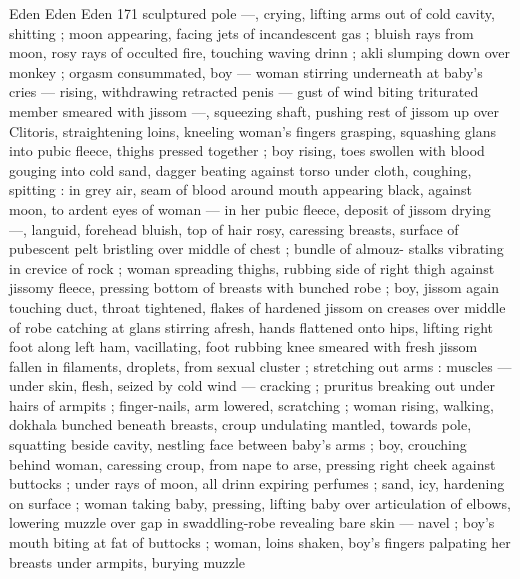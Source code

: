 Eden Eden Eden 171
sculptured pole —, crying, lifting arms out of cold cavity, shitting ;
moon appearing, facing jets of incandescent gas ; bluish rays from
moon, rosy rays of occulted fire, touching waving drinn ; akli
slumping down over monkey ; orgasm consummated, boy — woman
stirring underneath at baby’s cries — rising, withdrawing retracted
penis — gust of wind biting triturated member smeared with jissom
—, squeezing shaft, pushing rest of jissom up over Clitoris,
straightening loins, kneeling woman's fingers grasping, squashing
glans into pubic fleece, thighs pressed together ; boy rising, toes
swollen with blood gouging into cold sand, dagger beating against
torso under cloth, coughing, spitting : in grey air, seam of blood
around mouth appearing black, against moon, to ardent eyes of
woman — in her pubic fleece, deposit of jissom drying —, languid,
forehead bluish, top of hair rosy, caressing breasts, surface of
pubescent pelt bristling over middle of chest ; bundle of almouz-
stalks vibrating in crevice of rock ; woman spreading thighs, rubbing
side of right thigh against jissomy fleece, pressing bottom of breasts
with bunched robe ; boy, jissom again touching duct, throat
tightened, flakes of hardened jissom on creases over middle of robe
catching at glans stirring afresh, hands flattened onto hips, lifting
right foot along left ham, vacillating, foot rubbing knee smeared with
fresh jissom fallen in filaments, droplets, from sexual cluster ;
stretching out arms : muscles — under skin, flesh, seized by cold
wind — cracking ; pruritus breaking out under hairs of armpits ;
finger-nails, arm lowered, scratching ; woman rising, walking,
dokhala bunched beneath breasts, croup undulating mantled,
towards pole, squatting beside cavity, nestling face between baby’s
arms ; boy, crouching behind woman, caressing croup, from nape to
arse, pressing right cheek against buttocks ; under rays of moon, all
drinn expiring perfumes ; sand, icy, hardening on surface ; woman
taking baby, pressing, lifting baby over articulation of elbows,
lowering muzzle over gap in swaddling-robe revealing bare skin —
navel ; boy's mouth biting at fat of buttocks ; woman, loins shaken,
boy's fingers palpating her breasts under armpits, burying muzzle

